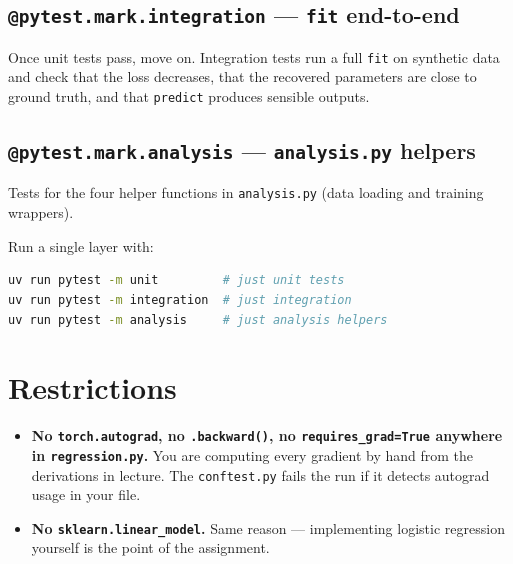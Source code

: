 \documentclass[11pt]{article}
\newcommand{\code}[1]{\texttt{\small #1}}
\begin{document}
\subsection*{\texttt{@pytest.mark.integration} --- \texttt{fit} end-to-end}

Once unit tests pass, move on. Integration tests run a full \code{fit} on
synthetic data and check that the loss decreases, that the recovered parameters
are close to ground truth, and that \code{predict} produces sensible outputs.

\subsection*{\texttt{@pytest.mark.analysis} --- \texttt{analysis.py} helpers}

Tests for the four helper functions in \code{analysis.py} (data loading and
training wrappers).

\medskip
\noindent
Run a single layer with:

\begin{lstlisting}[language=bash]
uv run pytest -m unit         # just unit tests
uv run pytest -m integration  # just integration
uv run pytest -m analysis     # just analysis helpers
\end{lstlisting}

\section{Restrictions}

\begin{itemize}
    \item \textbf{No \code{torch.autograd}, no \code{.backward()}, no
          \code{requires\_grad=True} anywhere in \code{regression.py}.} You are
          computing every gradient by hand from the derivations in lecture. The
          \code{conftest.py} fails the run if it detects autograd usage in your file.
    \item \textbf{No \code{sklearn.linear\_model}.} Same reason --- implementing
          logistic regression yourself is the point of the assignment.
\end{itemize}
\end{document}
